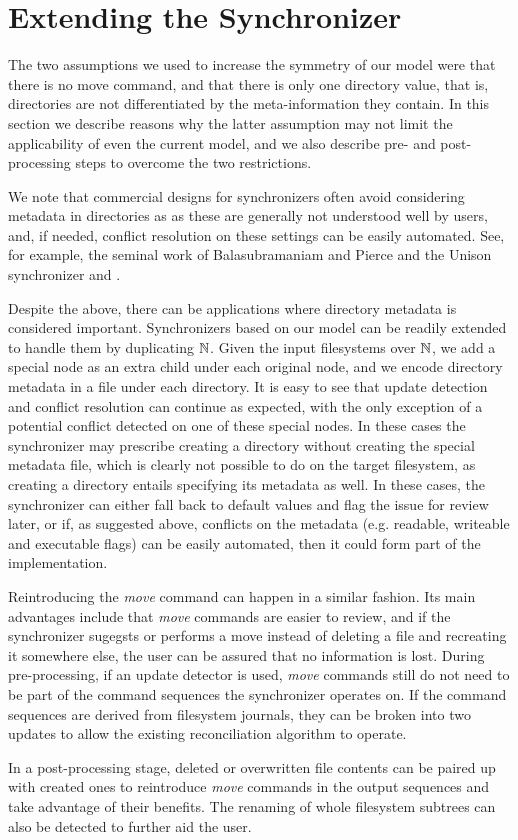 
\section{Extending the Synchronizer}

The two assumptions we used to increase the symmetry of our model were
that there is no move command,
and that
there is only one directory value, that is, directories are not differentiated
by the meta-information they contain.
In this section we describe reasons why the latter assumption may not limit the applicability
of even the current model, and we also describe pre- and post-processing steps
to overcome the two restrictions.

We note that commercial designs for synchronizers 
often avoid considering metadata in directories as
as these are generally not understood well by users,
and, if needed, conflict resolution on these settings can be easily automated.
See, for example, the seminal work of Balasubramaniam and Pierce and the Unison synchronizer \cite{BP} and \cite{BZ}.

Despite the above, there can be applications where directory metadata
is considered important.
Synchronizers based on our model can be readily extended to handle them
by duplicating $\mathbb{N}$. 
Given the input filesystems over $\mathbb{N}$, we add a special node as an extra child under each original node,
and we encode directory metadata in a file under each directory.
It is easy to see that update detection and conflict resolution can continue as expected,
with the only exception of a potential conflict detected on one of these special nodes.
In these cases the synchronizer may prescribe creating a directory without creating
the special metadata file, which is clearly not possible to do on the target filesystem,
as creating a directory entails specifying its metadata as well.
In these cases, the synchronizer can either fall back to default values and flag the issue
for review later, or if, as suggested above, conflicts on the metadata (e.g. readable, writeable and executable flags)
can be easily automated, then it could form part of the implementation.

Reintroducing the \emph{move} command can happen in a similar fashion.
Its main advantages include that 
\emph{move} commands are easier to review,
and if the synchronizer sugegsts or performs a move instead
of deleting a file and recreating it somewhere else, the user
can be assured that no information is lost.
During pre-processing, if an update detector is used,
\emph{move} commands still do not need to be part of the command sequences
the synchronizer operates on.
If the command sequences are derived from filesystem journals, they
can be broken into two updates to allow the existing reconciliation
algorithm to operate.

In a post-processing stage, deleted or overwritten file contents
can be paired up with created ones to reintroduce \emph{move}
commands in the output sequences and take advantage of their benefits.
The renaming of whole filesystem subtrees can also be detected
to further aid the user.
